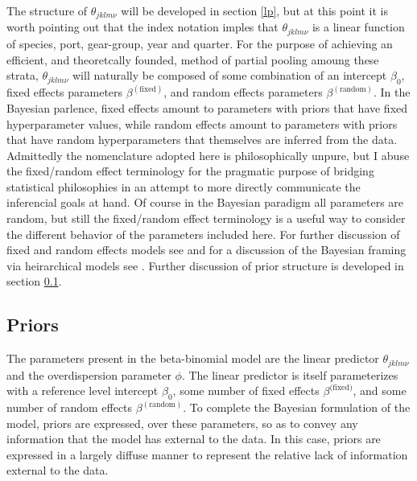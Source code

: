 \documentclass[12pt]{article}
\begin{document}
%
The structure of \(\theta_{jklm\nu}\) will be developed in section \ref{lp}, 
but at this point it is worth pointing out that the index notation imples that
\(\theta_{jklm\nu}\) is a linear function of species, port, gear-group, year 
and quarter. For the purpose of achieving an efficient, and theoretcally 
founded, method of partial pooling amoung these strata, \(\theta_{jklm\nu}\) 
will naturally be composed of some combination of an intercept $\beta_0$, 
fixed effects parameters $\beta^{(\text{fixed})}$, and random effects parameters
$\beta^{(\text{random})}$. In the Bayesian parlence, fixed effects amount to 
parameters with priors that have fixed hyperparameter values, while random 
effects amount to parameters with priors that have random hyperparameters that 
themselves are inferred from the data. Admittedly the nomenclature adopted here 
is philosophically unpure, but I abuse the fixed/random effect terminology for 
the pragmatic purpose of bridging statistical philosophies in an attempt to 
more directly communicate the inferencial goals at hand. Of course in the 
Bayesian paradigm all parameters are random, but still the fixed/random effect 
terminology is a useful way to consider the different behavior of the 
parameters included here. For further discussion of fixed and random effects 
models see \cite{nelder_generalized_1989} and for a discussion of the Bayesian 
framing via heirarchical models see \cite{gelman_bayesian_2013}. Further 
discussion of prior structure is developed in section \ref{priors}.

%

%
%
\subsection{Priors}\label{priors}
%
%

%
The parameters present in the beta-binomial model are the linear predictor 
\(\theta_{jklm\nu}\) and the overdispersion parameter $\phi$. The linear 
predictor is itself parameterizes with a reference level intercept $\beta_0$, 
some number of fixed effects $\beta^\text{(fixed)}$, and some number of random 
effects $\beta^{(\text{random})}$. To complete the Bayesian formulation of the 
model, priors are expressed, over these parameters, so as to convey any 
information that the model has external to the data. In this case, priors are 
expressed in a largely diffuse manner to represent the relative lack of 
information external to the data.  
\end{document}
